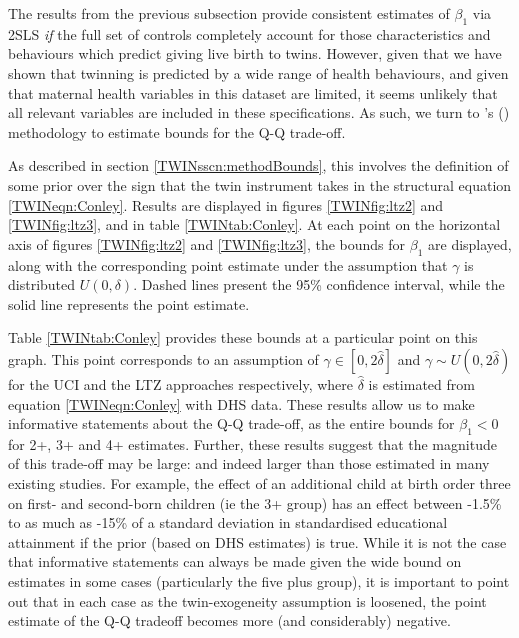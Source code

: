 The results from the previous subsection provide consistent estimates of 
$\beta_1$ via 2SLS \emph{if} the full set of controls completely account for 
those characteristics and behaviours which predict giving live birth to twins.  
However, given that we have shown that twinning is predicted by a wide range
of health behaviours, and given that maternal health variables in this dataset
are limited, it seems unlikely that all relevant variables are included in
these specifications.  As such, we turn to \citeauthor{Conleyetal2012}'s
(\citeyear{Conleyetal2012}) methodology to estimate bounds for the Q-Q trade-off.

As described in section \ref{TWINsscn:methodBounds}, this involves the 
definition of some prior over the sign that the twin instrument takes in the 
structural equation \ref{TWINeqn:Conley}.  Results are displayed in figures 
\ref{TWINfig:ltz2} and \ref{TWINfig:ltz3}, and in table \ref{TWINtab:Conley}.
At each point on the horizontal axis of figures \ref{TWINfig:ltz2} and 
\ref{TWINfig:ltz3}, the bounds for $\beta_1$ are displayed, along with the
corresponding point estimate under the assumption that $\gamma$ is distributed
$U(0,\delta)$.  Dashed lines present the 95\% confidence interval, while the
solid line represents the point estimate.

Table \ref{TWINtab:Conley} provides these bounds at a particular point on this
graph.  This point corresponds to an assumption of $\gamma \in [0,2\hat\delta]$
and $\gamma\sim U(0,2\hat\delta)$ for the UCI and the LTZ approaches respectively,
where $\hat\delta$ is estimated from equation \ref{TWINeqn:Conley} with DHS data.
These results allow us to make informative statements about the Q-Q trade-off,
as the entire bounds for $\beta_1<0$ for 2+, 3+ and 4+ estimates.  Further, these 
results suggest that the magnitude of this trade-off may be large: and indeed 
larger than those estimated in many existing studies.  For example, the effect of 
an additional child at birth order three on first- and second-born children (ie 
the 3+ group) has an effect between -1.5\% to as much as -15\% of a standard 
deviation in standardised educational attainment if the prior (based on DHS 
estimates) is true.  While it is not the case that informative statements can 
always be made given the wide bound on estimates in some cases (particularly the 
five plus group), it is important to point out that in each case as the 
twin-exogeneity assumption is loosened, the point estimate of the Q-Q tradeoff 
becomes more (and considerably) negative.
